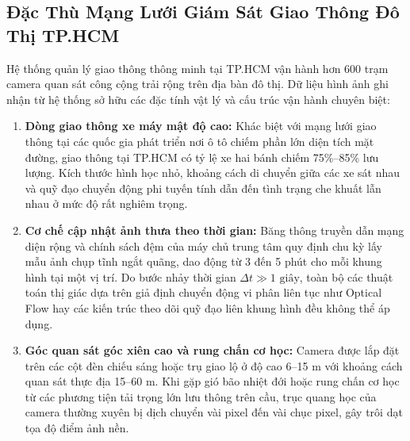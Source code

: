 \documentclass[11pt,a4paper]{article}
\begin{document}
\subsection{Đặc Thù Mạng Lưới Giám Sát Giao Thông Đô Thị TP.HCM}
Hệ thống quản lý giao thông thông minh tại TP.HCM vận hành hơn 600 trạm camera quan sát công cộng trải rộng trên địa bàn đô thị. Dữ liệu hình ảnh ghi nhận từ hệ thống sở hữu các đặc tính vật lý và cấu trúc vận hành chuyên biệt:
\begin{enumerate}
    \item \textbf{Dòng giao thông xe máy mật độ cao:} Khác biệt với mạng lưới giao thông tại các quốc gia phát triển nơi ô tô chiếm phần lớn diện tích mặt đường, giao thông tại TP.HCM có tỷ lệ xe hai bánh chiếm 75\%--85\% lưu lượng. Kích thước hình học nhỏ, khoảng cách di chuyển giữa các xe sát nhau và quỹ đạo chuyển động phi tuyến tính dẫn đến tình trạng che khuất lẫn nhau ở mức độ rất nghiêm trọng.
    \item \textbf{Cơ chế cập nhật ảnh thưa theo thời gian:} Băng thông truyền dẫn mạng diện rộng và chính sách đệm của máy chủ trung tâm quy định chu kỳ lấy mẫu ảnh chụp tĩnh ngắt quãng, dao động từ 3 đến 5 phút cho mỗi khung hình tại một vị trí. Do bước nhảy thời gian $\Delta t \gg 1\text{ giây}$, toàn bộ các thuật toán thị giác dựa trên giả định chuyển động vi phân liên tục như Optical Flow hay các kiến trúc theo dõi quỹ đạo liên khung hình đều không thể áp dụng.
    \item \textbf{Góc quan sát góc xiên cao và rung chấn cơ học:} Camera được lắp đặt trên các cột đèn chiếu sáng hoặc trụ giao lộ ở độ cao 6--15 m với khoảng cách quan sát thực địa 15--60 m. Khi gặp gió bão nhiệt đới hoặc rung chấn cơ học từ các phương tiện tải trọng lớn lưu thông trên cầu, trục quang học của camera thường xuyên bị dịch chuyển vài pixel đến vài chục pixel, gây trôi dạt tọa độ điểm ảnh nền.
\end{enumerate}
\end{document}
